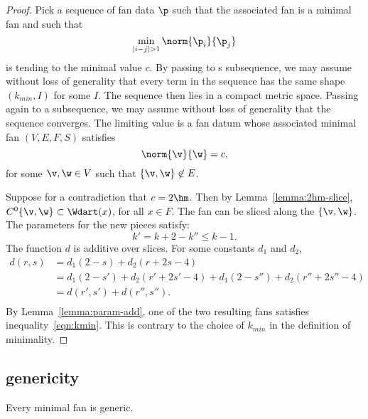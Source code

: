 \begin{proof} Pick a sequence of fan data $\p$ such that the associated fan is a minimal fan and such that 
\begin{displaymath}
\min_{|i-j|>1} \norm{\p_i}{\p_j}
\end{displaymath}
is tending to the minimal value $c$.  By passing to s subsequence, we
may assume without loss of generality that every term in the sequence
has the same shape $(k_{min},I)$ for some $I$.  The sequence then lies
in a compact metric space.  Passing again to a subsequence, we may
assume without loss of generality that the sequence converges.  The
limiting value is a fan datum whose associated minimal fan $(V,E,F,S)$
satisfies
\begin{displaymath}
\norm{\v}{\w}=c,
\end{displaymath}
for some $\v,\w\in V$ such that $\{\v,\w\}\not\in E$.

Suppose for a contradiction that $c=2\hm$.  Then by
Lemma~\ref{lemma:2hm-slice}, $C^0\{\v,\w\}\subset \Wdart(x)$, for all
$x\in F$.  The fan can be sliced along the $\{\v,\w\}$.  The
parameters for the new pieces satisfy:
\begin{displaymath}
k' = k+2 - k'' \le k-1.
\end{displaymath}
The function $d$ is additive over slices.  For some constants $d_1$
and $d_2$,
\begin{equation}\label{eqn:drs}
\begin{array}{lll}
d(r,s) &= d_1 (2 - s) + d_2 (r + 2 s-4) \\
&= d_1 (2-s') + d_2 (r'+2 s'-4) + d_1 (2-s'') + d_2 (r''+2s''-4)\\
&= d(r',s') + d(r'',s''). \\
\end{array}
\end{equation}
By Lemma~\ref{lemma:param-add}, one of the two resulting fans
satisfies inequality~\ref{eqn:kmin}.  This is contrary to the choice
of $k_{min}$ in the definition of minimality.
\end{proof}





\subsection{genericity}

\begin{lemma}[]\label{lemma:circular-nonmin}
Every minimal fan is generic.
\end{lemma}

